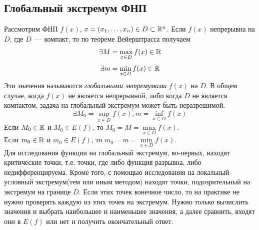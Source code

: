 \documentclass[../../main.tex]{subfiles}
\begin{document}
\begin{exmp}
	\section{Глобальный экстремум ФНП}
	
	Рассмотрим ФНП $f(x)$, $x = (x_1, \dots, 
	x_n) \in D \subset \mathbb{R}^n$. Если $f(x)$ непрерывна на $D$,
	где $D$~--- компакт, то по теореме Вейерштрасса получаем
	\[ \exists M = \max\limits_{x \in D} f(x) \in \mathbb{R} \] 
	\[ \exists m = \min\limits_{x \in D} f(x) \in \mathbb{R} \]
	Эти значения называются \emph{глобальными эктремумами} $f(x)$ на $D$.
	В общем случае, когда $f(x)$ не является непрерывной, либо когда $D$ 
	не является компактом, задача на глобальный экстремум может быть неразрешимой.
	\[ \exists M_0 = \sup\limits_{x \in D} f(x),
	m = \inf\limits_{x \in D} f(x) \]
	Если $M_0 \in \mathbb{R}$ и $M_0 \in E(f)$, то $M_0 = M = 
	\max\limits_{x \in D} f(x)$. \\
	Если $m_0 \in \mathbb{R}$ и $m_0 \in E(f)$, то $m_0 = m = 
	\min\limits_{x \in D} f(x)$. \\
	Для исследования функции на глобальный экстремум, во-первых, 
	находят критические точки, т.е. точки, 
	где либо функция разрывна, либо недифференцируема. Кроме того, с помощью 
	исследования на локальный условный экстремум(тем или иным методом)
	находят точки, подозрительный на экстремум на границе $D$.
	Если этих точек конечное число, то на практике не нужно проверять каждую из 
	этих точек на экстремум.
	Нужно только вычислить значения и выбрать наибольшее и наименьшее значения, 
	а далее сравнить, входят они в $E(f)$ или нет и 
	получить окончательный ответ.
	\end{exmp}
	
\end{document}
